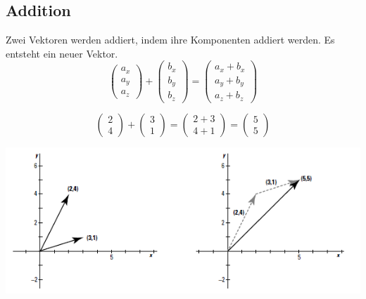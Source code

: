 \subsection{Addition}
Zwei Vektoren werden addiert, indem ihre Komponenten addiert werden. Es entsteht ein neuer Vektor.
\begin{equation*}
\begin{pmatrix}a_x\\a_y\\a_z\end{pmatrix} + \begin{pmatrix}b_x\\b_y\\b_z\end{pmatrix} = \begin{pmatrix}a_x + b_x\\a_y + b_y\\a_z + b_z\end{pmatrix}
\end{equation*}
\begin{myexample}
\begin{equation*}\begin{pmatrix}2\\4\end{pmatrix} + \begin{pmatrix}3\\1\end{pmatrix} = \begin{pmatrix}2+3\\4+1\end{pmatrix} = \begin{pmatrix}5\\5\end{pmatrix}\end{equation*}
\end{myexample}
\begin{center}\includegraphics[scale=0.85]{imgs/VektorAddition.png}\end{center}
